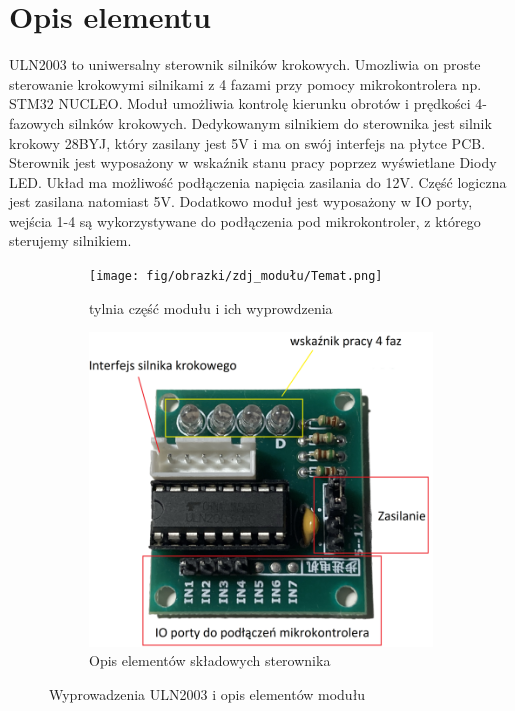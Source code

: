 \documentclass[11pt, a4paper]{article}
\author{Hubert Pietrzak}
\institute{Instytut Robotyki i Inteligencji Maszynowej}
\begin{document}
\newpage

\section*{Opis elementu} 

ULN2003 to uniwersalny sterownik silników krokowych. Umozliwia on proste sterowanie krokowymi silnikami z 4 fazami przy pomocy mikrokontrolera np. STM32 NUCLEO. Moduł umożliwia kontrolę kierunku obrotów i prędkości 4-fazowych silnków krokowych. Dedykowanym silnikiem do sterownika jest silnik krokowy 28BYJ, który zasilany jest 5V i ma on swój interfejs na płytce PCB. Sterownik jest wyposażony w wskaźnik stanu pracy poprzez wyświetlane Diody LED. Układ ma możliwość podłączenia napięcia zasilania do 12V. Część logiczna jest zasilana natomiast 5V.  Dodatkowo moduł jest wyposażony w IO porty, wejścia 1-4 są wykorzystywane do podłączenia pod mikrokontroler, z którego sterujemy silnikiem.

\vspace{0.5cm}
\begin{figure}[h]
\centering
\begin{subfigure}{.5\textwidth}
  \centering
  \texttt{[image: fig/obrazki/zdj\_modułu/Temat.png]}
  \caption{tylnia część modułu i ich wyprowdzenia}
  \label{fig:sub1}
\end{subfigure}%
\begin{subfigure}{.5\textwidth}
  \centering
  \includegraphics[width=.7\linewidth]{fig/obrazki/koncept.png}
  \caption{Opis elementów składowych sterownika}
  \label{fig:sub2}
\end{subfigure}
\caption{Wyprowadzenia ULN2003 i opis elementów modułu}
\label{fig:test}
\end{figure}
\vspace{0.5cm}
\end{document}
